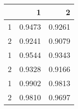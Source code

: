 \begin{tabular}{lrr}
\toprule
{} &       1 &       2 \\
\midrule
1 &  0.9473 &  0.9261 \\
2 &  0.9241 &  0.9079 \\
1 &  0.9544 &  0.9343 \\
2 &  0.9328 &  0.9166 \\
1 &  0.9902 &  0.9813 \\
2 &  0.9810 &  0.9697 \\
\bottomrule
\end{tabular}
